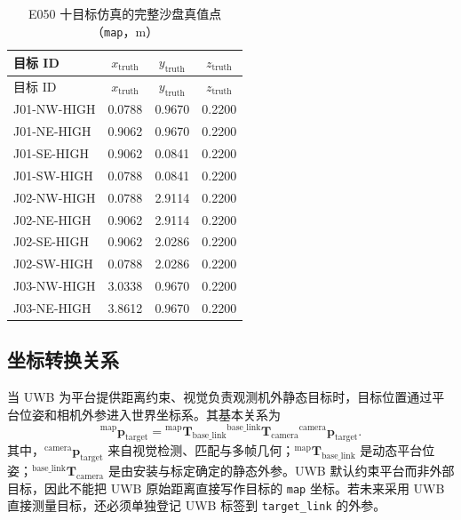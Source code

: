 \documentclass[UTF8,a4paper,12pt]{ctexart}
\begin{document}
\begin{longtable}{p{3.2cm}ccc}
\caption{E050 十目标仿真的完整沙盘真值点（\texttt{map}，m）}\label{tab:sandbox-ten-truth}\\
\toprule
目标 ID & $x_{\mathrm{truth}}$ & $y_{\mathrm{truth}}$ & $z_{\mathrm{truth}}$ \\
\midrule
\endfirsthead
\toprule
目标 ID & $x_{\mathrm{truth}}$ & $y_{\mathrm{truth}}$ & $z_{\mathrm{truth}}$ \\
\midrule
\endhead
J01-NW-HIGH & 0.0788 & 0.9670 & 0.2200 \\
J01-NE-HIGH & 0.9062 & 0.9670 & 0.2200 \\
J01-SE-HIGH & 0.9062 & 0.0841 & 0.2200 \\
J01-SW-HIGH & 0.0788 & 0.0841 & 0.2200 \\
J02-NW-HIGH & 0.0788 & 2.9114 & 0.2200 \\
J02-NE-HIGH & 0.9062 & 2.9114 & 0.2200 \\
J02-SE-HIGH & 0.9062 & 2.0286 & 0.2200 \\
J02-SW-HIGH & 0.0788 & 2.0286 & 0.2200 \\
J03-NW-HIGH & 3.0338 & 0.9670 & 0.2200 \\
J03-NE-HIGH & 3.8612 & 0.9670 & 0.2200 \\
\bottomrule
\end{longtable}

\subsection{坐标转换关系}
当 UWB 为平台提供距离约束、视觉负责观测机外静态目标时，目标位置通过平台位姿和相机外参进入世界坐标系。其基本关系为
\[
{}^{\mathrm{map}}\mathbf{p}_{\mathrm{target}}
= {}^{\mathrm{map}}\mathbf{T}_{\mathrm{base\_link}}
  {}^{\mathrm{base\_link}}\mathbf{T}_{\mathrm{camera}}
  {}^{\mathrm{camera}}\mathbf{p}_{\mathrm{target}} .
\]
其中，${}^{\mathrm{camera}}\mathbf{p}_{\mathrm{target}}$ 来自视觉检测、匹配与多帧几何；${}^{\mathrm{map}}\mathbf{T}_{\mathrm{base\_link}}$ 是动态平台位姿；${}^{\mathrm{base\_link}}\mathbf{T}_{\mathrm{camera}}$ 是由安装与标定确定的静态外参。UWB 默认约束平台而非外部目标，因此不能把 UWB 原始距离直接写作目标的 \texttt{map} 坐标。若未来采用 UWB 直接测量目标，还必须单独登记 UWB 标签到 \texttt{target\_link} 的外参。
\end{document}
